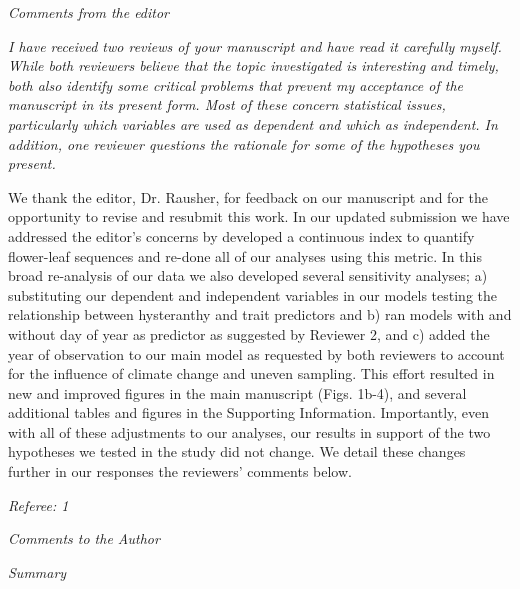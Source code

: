 \documentclass{article}[12pt]
\begin{document}


\emph{Comments from the editor}

\emph{I have received two reviews of your manuscript and have read it carefully myself.  While both reviewers believe that the topic investigated is interesting and timely, both also identify some critical problems that prevent my acceptance of the manuscript in its present form.  Most of these concern statistical issues, particularly which variables are used as dependent and which as independent.  In addition, one reviewer questions the rationale for some of the hypotheses you present.}

We thank the editor, Dr. Rausher, for feedback on our manuscript and for the opportunity to revise and resubmit this work. In our updated submission we have addressed the editor's concerns by developed a continuous index to quantify flower-leaf sequences and re-done all of our analyses using this metric. In this broad re-analysis of our data we also developed several sensitivity analyses; a) substituting our dependent and independent variables in our models testing the relationship between hysteranthy and trait predictors and b) ran models with and without day of year as predictor as suggested by Reviewer 2, and c) added the year of observation to our main model as requested by both reviewers to account for the influence of climate change and uneven sampling. This effort resulted in  new and improved figures in the main manuscript (Figs. 1b-4), and several additional tables and figures in the Supporting Information. Importantly, even with all of these adjustments to our analyses, our results in support of the two hypotheses we tested in the study did not change. We detail these changes further in our responses the reviewers' comments below.



\emph{Referee: 1}

\emph{Comments to the Author}

\emph{Summary}
\end{document}
